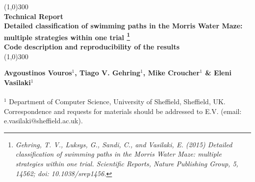 \documentclass[12pt,titlepage]{article}
\begin{document}
\setcounter{page}{1}		

\begin{center}
	\line(1,0){300} \\
	[0.10in]
	\huge{\bfseries Technical Report} \\
	[0.2in]
	\large{\bfseries Detailed classification of swimming paths in the Morris Water Maze: multiple strategies within one trial
		\footnote[1]{\textit{Gehring, T. V., Luksys, G., Sandi, C., and Vasilaki, E. (2015) Detailed classification of swimming paths in the Morris Water Maze: multiple strategies within one trial. Scientific Reports, Nature Publishing Group, 5, 14562; doi: 10.1038/srep1456.}}}
	\\
	[0.2in]
	\Large{\bfseries Code description and reproducibility of the  results}
	\\
	[0.005in]
	\line(1,0){300} \\
\end{center}
\noindent
\large{\textbf{Avgoustinos Vouros$^1$, Tiago V. Gehring$^1$, Mike Croucher$^1$ \& Eleni Vasilaki$^1$}}
\\ \\
\noindent	
{\small$^1$ Department of Computer Science, University of Sheffield, Sheffield, UK. Correspondence and requests for materials should be addressed to E.V. (email: e.vasilaki$@$sheffield.ac.uk).}
\\
\end{document}
